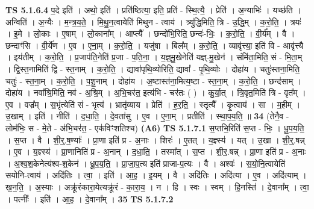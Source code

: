 \documentclass[17pt]{extarticle}
\begin{document}
                  \newline
                                \textbf{ TS 5.1.6.4} \newline
                  प॒दे इति॑ । अथो॒ इति॑ । प्रति॑ष्ठित्या॒ इति॒ प्रति॑ - स्थि॒त्यै॒ । प्रेति॑ । अ॒न्याभिः॑ । यच्छ॑ति । अन्विति॑ । अ॒न्यैः । म॒न्त्र॒य॒ते॒ । मि॒थु॒न॒त्वायेति॑ मिथुन - त्वाय॑ । त्र्यु॑द्धि॒मिति॒ त्रि - उ॒द्धि॒म् । क॒रो॒ति॒ । त्रयः॑ । इ॒मे । लो॒काः । ए॒षाम् । लो॒काना᳚म् । आप्त्यै᳚ । छन्दो॑भि॒रिति॒ छन्दः॑-भिः॒ । क॒रो॒ति॒ । वी॒र्य᳚म् । वै । छन्दाꣳ॑सि । वी॒र्ये॑ण । ए॒व । ए॒ना॒म् । क॒रो॒ति॒ । यजु॑षा । बिल᳚म् । क॒रो॒ति॒ । व्यावृ॑त्त्या॒ इति॑ वि - आवृ॑त्त्यै । इय॑तीम् । क॒रो॒ति॒ । प्र॒जाप॑ति॒नेति॑ प्र॒जा - प॒ति॒ना॒ । य॒ज्ञ्॒मु॒खेनेति॑ यज्ञ्-मु॒खेन॑ । संमि॑ता॒मिति॒ सं - मि॒ता॒म् । द्वि॒स्त॒नामिति॑ द्वि - स्त॒नाम् । क॒रो॒ति॒ । द्यावा॑पृथि॒व्योरिति॒ द्यावा᳚ - पृ॒थि॒व्योः । दोहा॑य । चतुः॑स्तना॒मिति॒ चतुः॑ - स्त॒ना॒म् । क॒रो॒ति॒ । प॒शू॒नाम् । दोहा॑य । अ॒ष्टास्त॑ना॒मित्य॒ष्टा - स्त॒ना॒म् । क॒रो॒ति॒ । छन्द॑साम् । दोहा॑य । नवा᳚श्रि॒मिति॒ नव॑ - अ॒श्रि॒म् । अ॒भि॒चर॑त॒ इत्य॑भि - चर॑तः ( ) । कु॒र्या॒त् । त्रि॒वृत॒मिति॑ त्रि - वृत᳚म् । ए॒व । वज्र᳚म् । स॒भृंत्येति॑ सं - भृत्य॑ । भ्रातृ॑व्याय । प्रेति॑ । ह॒र॒ति॒ । स्तृत्यै᳚ । कृ॒त्वाय॑ । सा । म॒हीम् । उ॒खाम् । इति॑ । नीति॑ । द॒धा॒ति॒ । दे॒वता॑सु । ए॒व । ए॒ना॒म् । प्रतीति॑ । स्था॒प॒य॒ति॒ ॥ \textbf{  34} \newline
                  \newline
                      (तेनै॒व - लोम॑भिः॒ स - मे॒ते - अ॑भि॒चर॑त॒ - एक॑विꣳशतिश्च)  \textbf{(A6)} \newline \newline
                                \textbf{ TS 5.1.7.1} \newline
                  स॒प्तभि॒रिति॑ स॒प्त - भिः॒ । धू॒प॒य॒ति॒ । स॒प्त । वै । शी॒र्॒.ष॒ण्याः᳚ । प्रा॒णा इति॑ प्र - अ॒नाः । शिरः॑ । ए॒तत् । य॒ज्ञ्स्य॑ । यत् । उ॒खा । शी॒र्॒.षन्न् । ए॒व । य॒ज्ञ्स्य॑ । प्रा॒णानिति॑ प्र - अ॒नान् । द॒धा॒ति॒ । तस्मा᳚त् । स॒प्त । शी॒र॒.षन्न् । प्रा॒णा इति॑ प्र - अ॒नाः । अ॒श्व॒श॒केनेत्य॑श्व-श॒केन॑ । धू॒प॒य॒ति॒ । प्रा॒जा॒प॒त्य इति॑ प्राजा-प॒त्यः । वै । अश्वः॑ । स॒यो॒नि॒त्वायेति॑ सयोनि-त्वाय॑ । अदि॑तिः । त्वा॒ । इति॑ । आ॒ह॒ । इ॒यम् । वै । अदि॑तिः । अदि॑त्या । ए॒व । अदि॑त्याम् । ख॒न॒ति॒ । अ॒स्याः । अक्रू॑रंकारा॒येत्यक्रू॑रं - का॒रा॒य॒ । न । हि । स्वः । स्वम् । हि॒नस्ति॑ । दे॒वाना᳚म् । त्वा॒ । पत्नीः᳚ । इति॑ । आ॒ह॒ । दे॒वाना᳚म् । \textbf{  35 } \newline
                  \newline
                                \textbf{ TS 5.1.7.2} \newline
\end{document}

